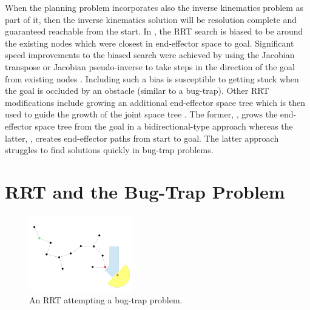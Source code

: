 \documentclass[conference]{IEEEtran}
\begin{document}
When the planning problem incorporates also the inverse kinematics problem
as part of it, then the inverse kinematics solution will be resolution
complete and guaranteed reachable from the start. In \cite{bertram06}, the
RRT search is biased to be around the existing nodes which were closest in 
end-effector space to goal.  Significant speed improvements to the biased
search were achieved by using the Jacobian transpose or Jacobian 
pseudo-inverse to take steps in the direction of the goal from existing
nodes \cite{vahrenkamp09,vande07}.  Including such a bias is susceptible to 
getting stuck when the goal is occluded by an obstacle (similar to a
bug-trap).  Other RRT modifications include growing an additional
end-effector space tree which is then used to guide the growth of the
joint space tree \cite{diankov08,yao05}.  The former, \cite{diankov08},
grows the end-effector space tree from the goal in a bidirectional-type 
approach whereas the latter, \cite{yao05}, creates end-effector paths from 
start to goal. The latter approach struggles to find solutions quickly in 
bug-trap problems.
 
\section{RRT and the Bug-Trap Problem}
\label{sec:bugtraprrt}

\begin{figure}[h!]
  \centering
    \includegraphics[width=0.4\textwidth]{figures/BugTrapRRT.pdf}
  \caption{An RRT attempting a bug-trap problem. \label{fig:BugTrapRRT} }
\end{figure}
\end{document}
